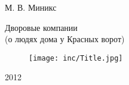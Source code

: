 \thispagestyle{empty} 

\begin{center}
М. В. Миникс

\vfill

\large Дворовые компании \\(о людях дома у Красных ворот)

\vfill

\begin{figure}[ht]
  \centering
  \texttt{[image: inc/Title.jpg]}
\end{figure}

\vfill

2012

\end{center}

\newpage
